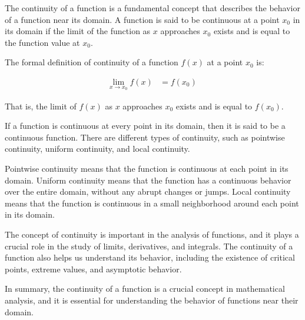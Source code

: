 \documentclass[12pt,openany]{book}
\theoremstyle{definition}
\begin{document}
	
	The continuity of a function is a fundamental concept that describes the behavior of a function near its domain. A function is said to be continuous at a point $x_0$ in its domain if the limit of the function as $x$ approaches $x_0$ exists and is equal to the function value at $x_0$.
	
	The formal definition of continuity of a function $f(x)$ at a point $x_0$ is:
	
	\begin{align*}
		\lim_{x \to x_0}f(x) &= f(x_0)\
	\end{align*}
	
	That is, the limit of $f(x)$ as $x$ approaches $x_0$ exists and is equal to $f(x_0)$.
	
	If a function is continuous at every point in its domain, then it is said to be a continuous function. There are different types of continuity, such as pointwise continuity, uniform continuity, and local continuity.
	
	Pointwise continuity means that the function is continuous at each point in its domain. Uniform continuity means that the function has a continuous behavior over the entire domain, without any abrupt changes or jumps. Local continuity means that the function is continuous in a small neighborhood around each point in its domain.
	
	The concept of continuity is important in the analysis of functions, and it plays a crucial role in the study of limits, derivatives, and integrals. The continuity of a function also helps us understand its behavior, including the existence of critical points, extreme values, and asymptotic behavior.
	
	In summary, the continuity of a function is a crucial concept in mathematical analysis, and it is essential for understanding the behavior of functions near their domain.
	
	\newpage
\end{document}
